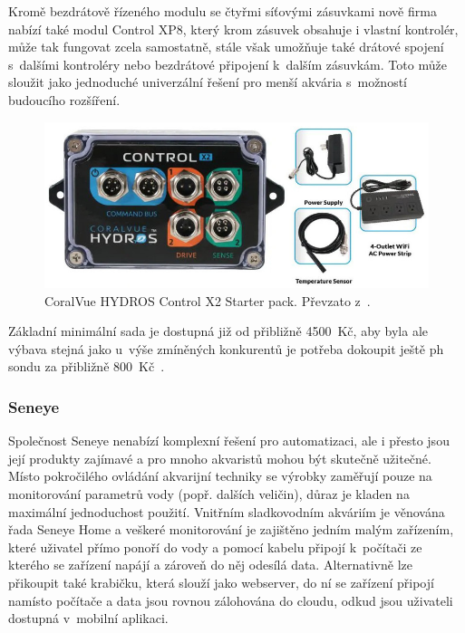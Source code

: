             Kromě bezdrátově řízeného modulu se čtyřmi síťovými zásuvkami nově firma nabízí také modul Control XP8, který krom zásuvek obsahuje i vlastní kontrolér, může tak fungovat zcela samostatně, stále však umožňuje také drátové spojení s~dalšími kontroléry nebo bezdrátové připojení k~dalším zásuvkám. Toto může sloužit jako jednoduché univerzální řešení pro menší akvária s~možností budoucího rozšíření. 

            \begin{figure}[h!]
                \centering
                \includegraphics[width=\textwidth]{obrazky/trh/hydros-x2-starter-pack.jpg}
                \caption{CoralVue HYDROS Control X2 Starter pack. Převzato z~\cite{eshop-coralvue-hydros}.}
                \label{fig:obrazky-trh-hydros-x2-starter-pack-jpg}
            \end{figure}
            
            Základní minimální sada je dostupná již od přibližně \qty{4500}{Kč}, aby byla ale výbava stejná jako u~výše zmíněných konkurentů je potřeba dokoupit ještě \acs{ph} sondu za přibližně \qty{800}{Kč}~\cite{coralvuehydros,eshop-coralvue-hydros}.
            
        \subsubsection{Seneye}
            Společnost Seneye nenabízí komplexní řešení pro automatizaci, ale i přesto jsou její produkty zajímavé a pro mnoho akvaristů mohou být skutečně užitečné. Místo pokročilého ovládání akvarijní techniky se výrobky zaměřují pouze na monitorování parametrů vody (popř. dalších veličin), důraz je kladen na maximální jednoduchost použití. Vnitřním sladkovodním akváriím je věnována řada Seneye Home a veškeré monitorování je zajištěno jedním malým zařízením, které uživatel přímo ponoří do vody a pomocí kabelu připojí k~počítači ze kterého se zařízení napájí a zároveň do něj odesílá data. Alternativně lze přikoupit také krabičku, která slouží jako webserver, do ní se zařízení připojí namísto počítače a data jsou rovnou zálohována do cloudu, odkud jsou uživateli dostupná v~mobilní aplikaci.

